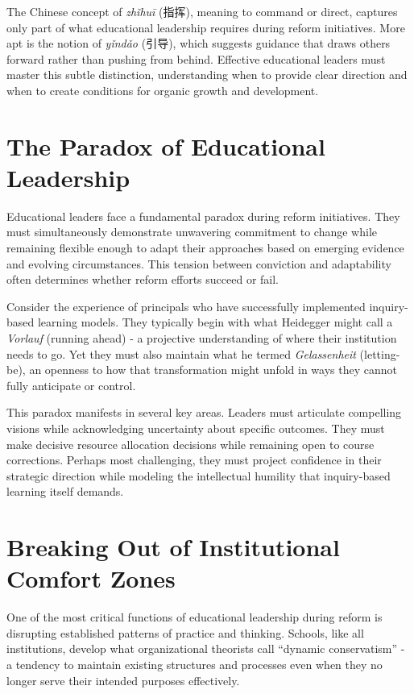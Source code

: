 \documentclass[
  Letterpaper,
]{scrbook}
\begin{document}
The Chinese concept of \emph{zhǐhuī} (指挥), meaning to command or
direct, captures only part of what educational leadership requires
during reform initiatives. More apt is the notion of \emph{yǐndǎo}
(引导), which suggests guidance that draws others forward rather than
pushing from behind. Effective educational leaders must master this
subtle distinction, understanding when to provide clear direction and
when to create conditions for organic growth and development.

\section{The Paradox of Educational
Leadership}\label{the-paradox-of-educational-leadership}

Educational leaders face a fundamental paradox during reform
initiatives. They must simultaneously demonstrate unwavering commitment
to change while remaining flexible enough to adapt their approaches
based on emerging evidence and evolving circumstances. This tension
between conviction and adaptability often determines whether reform
efforts succeed or fail.

Consider the experience of principals who have successfully implemented
inquiry-based learning models. They typically begin with what Heidegger
might call a \emph{Vorlauf} (running ahead) - a projective understanding
of where their institution needs to go. Yet they must also maintain what
he termed \emph{Gelassenheit} (letting-be), an openness to how that
transformation might unfold in ways they cannot fully anticipate or
control.

This paradox manifests in several key areas. Leaders must articulate
compelling visions while acknowledging uncertainty about specific
outcomes. They must make decisive resource allocation decisions while
remaining open to course corrections. Perhaps most challenging, they
must project confidence in their strategic direction while modeling the
intellectual humility that inquiry-based learning itself demands.

\section{Breaking Out of Institutional Comfort
Zones}\label{breaking-out-of-institutional-comfort-zones}

One of the most critical functions of educational leadership during
reform is disrupting established patterns of practice and thinking.
Schools, like all institutions, develop what organizational theorists
call ``dynamic conservatism'' - a tendency to maintain existing
structures and processes even when they no longer serve their intended
purposes effectively.
\end{document}
